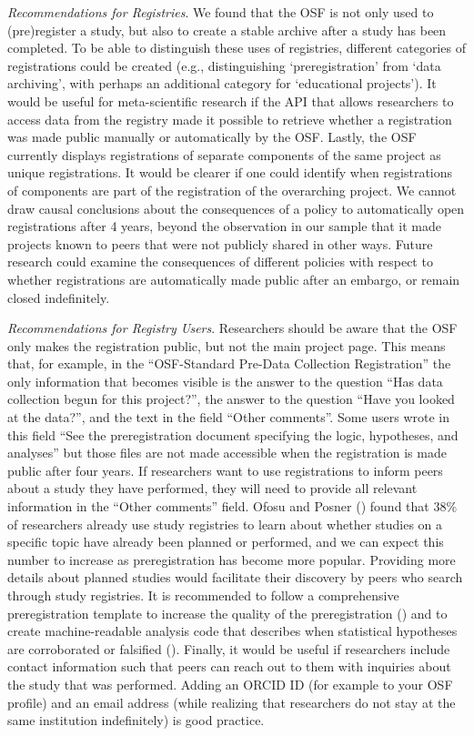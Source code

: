 \documentclass[
  ,man, a4paper,floatsintext]{apa6}
\begin{document}
\emph{Recommendations for Registries}. We found that the OSF is not only used to (pre)register a study, but also to create a stable archive after a study has been completed. To be able to distinguish these uses of registries, different categories of registrations could be created (e.g., distinguishing `preregistration' from `data archiving', with perhaps an additional category for `educational projects'). It would be useful for meta-scientific research if the API that allows researchers to access data from the registry made it possible to retrieve whether a registration was made public manually or automatically by the OSF. Lastly, the OSF currently displays registrations of separate components of the same project as unique registrations. It would be clearer if one could identify when registrations of components are part of the registration of the overarching project. We cannot draw causal conclusions about the consequences of a policy to automatically open registrations after 4 years, beyond the observation in our sample that it made projects known to peers that were not publicly shared in other ways. Future research could examine the consequences of different policies with respect to whether registrations are automatically made public after an embargo, or remain closed indefinitely.

\emph{Recommendations for Registry Users}. Researchers should be aware that the OSF only makes the registration public, but not the main project page. This means that, for example, in the ``OSF-Standard Pre-Data Collection Registration'' the only information that becomes visible is the answer to the question ``Has data collection begun for this project?'', the answer to the question ``Have you looked at the data?'', and the text in the field ``Other comments''. Some users wrote in this field ``See the preregistration document specifying the logic, hypotheses, and analyses'' but those files are not made accessible when the registration is made public after four years. If researchers want to use registrations to inform peers about a study they have performed, they will need to provide all relevant information in the ``Other comments'' field. Ofosu and Posner () found that 38\% of researchers already use study registries to learn about whether studies on a specific topic have already been planned or performed, and we can expect this number to increase as preregistration has become more popular. Providing more details about planned studies would facilitate their discovery by peers who search through study registries. It is recommended to follow a comprehensive preregistration template to increase the quality of the preregistration () and to create machine-readable analysis code that describes when statistical hypotheses are corroborated or falsified (). Finally, it would be useful if researchers include contact information such that peers can reach out to them with inquiries about the study that was performed. Adding an ORCID ID (for example to your OSF profile) and an email address (while realizing that researchers do not stay at the same institution indefinitely) is good practice.
\end{document}
